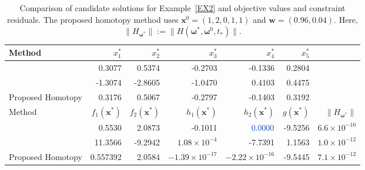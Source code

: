 \documentclass[11pt,pdflatex,sn-mathphys-ay]{sn-jnl}%
\theoremstyle{definition}
\theoremstyle{thmstyleone}%
\theoremstyle{thmstyletwo}%
\theoremstyle{thmstylethree}%
\newcommand{\add}[1]{\textcolor{revisionblue}{#1}}
\begin{document}
	\begin{table}[htbp]
		\centering
		\caption{Comparison of candidate solutions for Example~\ref{EX2} and objective values and constraint residuals.
			The proposed homotopy method uses
			$\bm{x}^{0}=(1,2,0,1,1)$ and $\bm{w}=(0.96,0.04)$.
			Here,
			$\|H_{\bm{\omega}^*}\|
			:=\|H(\bm{\omega}^*,\bm{\omega}^{0},t_*)\|$.}
		\label{tab:comparison_literature_example1}
		
		\begin{tabular}{lrrrrrr}
			\toprule
			Method
			& $x_1^*$ & $x_2^*$ & $x_3^*$ & $x_4^*$ & $x_5^*$ & \\
			\midrule
			\cite{shang2011}
			& 0.3077 & 0.5374 & -0.2703 & -0.1336 & 0.2804 & \\
			\cite{zhao2012quasinormal}
			& -1.3074 & -2.8605 & -1.0470 & 0.4103 & 0.4475 & \\
			Proposed Homotopy
			& 0.3176 & 0.5067 & -0.2797 & -0.1403 & 0.3192 & \\
			
			\midrule
			Method
			& $f_1(\bm{x}^*)$
			& $f_2(\bm{x}^*)$
			& $h_1(\bm{x}^*)$
			& $h_2(\bm{x}^*)$
			& $g(\bm{x}^*)$
			& $\|H_{\bm{\omega}^*}\|$ \\
			\midrule
			\cite{shang2011}
			& 0.5530
			& 2.0873
			& -0.1011
			& $\add{0.0000}$
			& -9.5256
			& $6.6\times10^{-16}$ \\
			\cite{zhao2012quasinormal}
			& 11.3566
			& -9.2942
			& $1.08\times10^{-4}$
			& -7.7391
			& 1.1563
			& $1.0\times10^{-12}$ \\
			Proposed Homotopy
			& 0.557392
			& 2.0584
			& $-1.39\times10^{-17}$
			& $-2.22\times10^{-16}$
			& -9.5445
			& $7.1\times10^{-12}$ \\
			\bottomrule
		\end{tabular}
	\end{table}
	
\end{document}
